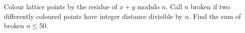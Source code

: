 Colour lattice points by the residue of $x+y$ modulo $n$. Call $n$ broken if two differently coloured points have integer distance divisible by $n$. Find the sum of broken $n\le50$.
